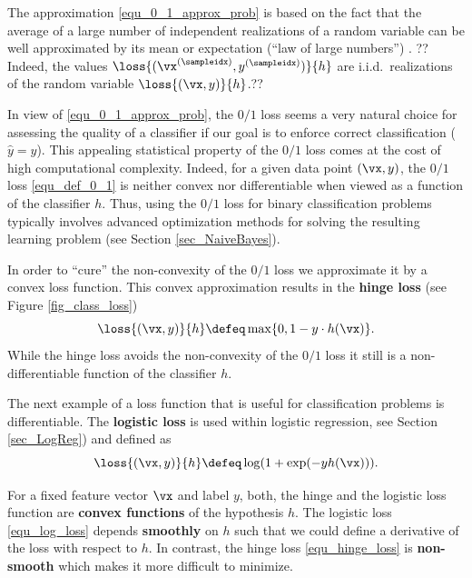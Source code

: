 \documentclass[12pt]{report}
\begin{document}
The approximation \eqref{equ_0_1_approx_prob} is based on the fact 
that the average of a large number of independent realizations of a 
random variable can be well approximated by its mean or expectation 
(``law of large numbers'') \cite{BillingsleyProbMeasure}.  
?? Indeed, the values $\loss{(\vx^{(\sampleidx)},y^{(\sampleidx)})}{h}$ are i.i.d.\ realizations of the random variable 
$\loss{(\vx,y)}{h}$.??

In view of \eqref{equ_0_1_approx_prob}, the $0/1$ loss seems 
a very natural choice for assessing the quality of a classifier 
if our goal is to enforce correct classification ($\hat{y}=y$). 
This appealing statistical property of the $0/1$ loss comes 
at the cost of high computational complexity. Indeed, for a 
given data point $(\vx,y)$, the $0/1$ loss \eqref{equ_def_0_1} 
is neither convex nor differentiable when viewed as a function 
of the classifier $h$. Thus, using the $0/1$ loss for binary 
classification problems typically involves advanced optimization 
methods for solving the resulting learning problem (see Section \ref{sec_NaiveBayes}). 

In order to ``cure'' the non-convexity of the $0/1$ loss we 
approximate it by a convex loss function. This convex 
approximation results in the {\bf hinge loss} (see Figure \ref{fig_class_loss}) 
\begin{equation} 
\label{equ_hinge_loss}
\loss{(\vx,y)}{h} \defeq \max \{ 0 , 1 - y\cdot h(\vx) \}. 
\end{equation}
While the hinge loss avoids the non-convexity of the $0/1$ 
loss it still is a non-differentiable function of the classifier $h$. 

The next example of a loss function that is useful for 
classification problems is differentiable. The {\bf logistic loss} 
is used within logistic regression, see Section \ref{sec_LogReg}) 
and defined as 
\begin{equation} 
\label{equ_log_loss}
\loss{(\vx,y)}{h} \defeq  \log ( 1 + \exp(- y h(\vx))). 
\end{equation}

For a fixed feature vector $\vx$ and label $y$, both, the hinge 
and the logistic loss function are {\bf convex functions} of 
the hypothesis $h$. The logistic loss \eqref{equ_log_loss} 
depends {\bf smoothly} on $h$ such that we could define a derivative 
of the loss with respect to $h$. In contrast, the hinge loss 
\eqref{equ_hinge_loss} is {\bf non-smooth} which makes it 
more difficult to minimize. 
\end{document}
